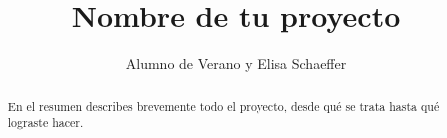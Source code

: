 \documentclass[a0]{sciposter} %
\title{Nombre de tu proyecto}
\author{Alumno de Verano y Elisa Schaeffer}
\institute {Posgrado en Ingeniería de Sistemas}
\begin{document}

\maketitle
\begin{abstract}
En el resumen describes brevemente todo el proyecto, desde qué se
trata hasta qué lograste hacer.
\end{abstract}
\end{document}
